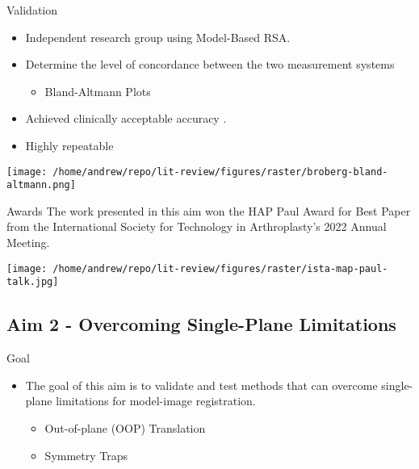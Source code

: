 \documentclass[presentation, aspectratio=1610]{beamer}
\begin{document}
\begin{frame}[label={sec:orgdef350a}]{Validation}
\begin{itemize}
\item Independent research group using Model-Based RSA.
\item Determine the level of concordance between the two measurement systems
\begin{itemize}
\item Bland-Altmann Plots
\end{itemize}
\item Achieved clinically acceptable accuracy \autocites{brobergValidationMachineLearning2023}[][]{jensenJointTrackMachine2022}.
\item Highly repeatable
\end{itemize}

\begin{center}
\texttt{[image: /home/andrew/repo/lit-review/figures/raster/broberg-bland-altmann.png]}
\end{center}
\end{frame}
\begin{frame}[label={sec:orgb482f42}]{Awards}
The work presented in this aim won the HAP Paul Award for Best Paper from the International Society for Technology in Arthroplasty's 2022 Annual Meeting.
\begin{center}
\texttt{[image: /home/andrew/repo/lit-review/figures/raster/ista-map-paul-talk.jpg]}
\end{center}
\end{frame}
\subsection{Aim 2 - Overcoming Single-Plane Limitations}
\label{sec:org298ad5d}
\begin{frame}[label={sec:orgc7de113}]{Goal}
\begin{itemize}
\item The goal of this aim is to validate and test methods that can overcome single-plane limitations for model-image registration.
\begin{itemize}
\item Out-of-plane (OOP) Translation
\item Symmetry Traps
\end{itemize}
\end{itemize}
\end{frame}
\end{document}
